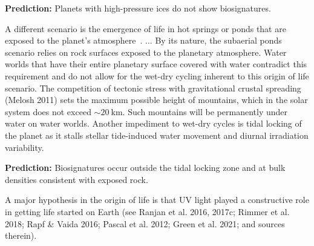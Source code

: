 \documentclass[twocolumn,twocolappendix,linenumbers]{aastex631}
\begin{document}
\textbf{Prediction:} Planets with high-pressure ices do not show biosignatures.

A different scenario is the emergence of life in hot springs or ponds that are exposed to the planet's atmosphere~\citep[e.g.,][]{Deamer2019}.
...
By its nature, the subaerial ponds scenario relies on rock surfaces exposed to the planetary atmosphere.
Water worlds that have their entire planetary surface covered with water contradict this requirement and do not allow for the wet-dry cycling inherent to this origin of life scenario.
The competition of tectonic stress with gravitational crustal spreading (Melosh 2011) sets the maximum possible height of mountains, which in the solar system does not exceed $\sim \SI{20}{\kilo\meter}$.
Such mountains will be permanently under water on water worlds.
Another impediment to wet-dry cycles is tidal locking of the planet as it stalls stellar tide-induced water movement and diurnal irradiation variability.

\textbf{Prediction:} Biosignatures occur outside the tidal locking zone and at bulk densities consistent with exposed rock.


A major hypothesis in the origin of life is that UV light played a constructive role in getting life started on Earth (see Ranjan et al. 2016, 2017c; Rimmer et al. 2018; Rapf \& Vaida 2016; Pascal et al. 2012; Green et al. 2021; and sources therein).
\end{document}
